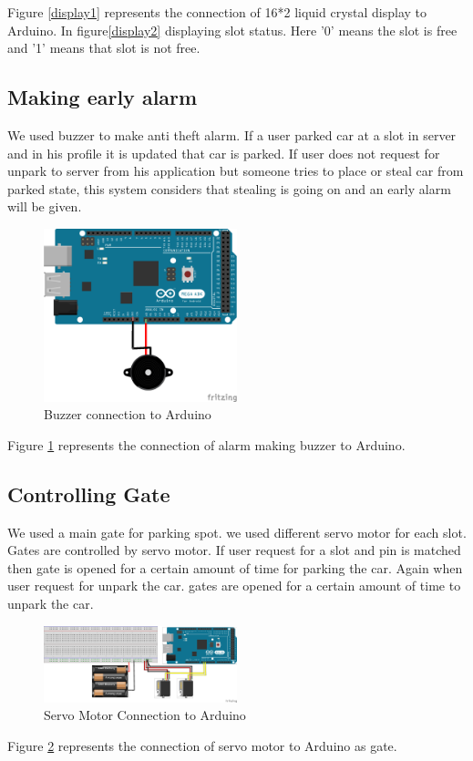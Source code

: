 Figure \ref{display1} represents the connection of 16*2 liquid crystal display to Arduino. In figure\ref{display2} displaying slot status. Here '0' means the slot is free and '1' means that slot is not free.

\subsection{Making early alarm}
We used buzzer to make anti theft alarm. If a user parked car at a slot in server and in his profile it is updated that car is parked. If user does not request for unpark to server from his application but someone tries to place or steal car from parked state, this system considers that stealing is going on and an early alarm will be given. 
\begin{figure}[H]
\centering
\includegraphics[width=0.5\textwidth]{figures/buzzer_bb.png}
\caption{Buzzer connection to Arduino}
\label{display}
\end{figure}
Figure \ref{display} represents the connection of alarm making buzzer to Arduino.

\subsection{Controlling Gate}
We used a main gate for parking spot. we used different servo motor for each slot. Gates are controlled by servo motor. If user request for a slot and pin is matched then gate is opened for a certain amount of time for parking the car. Again when user request for unpark the car. gates are opened for a certain amount of time to unpark the car.
\begin{figure}[H]
\centering
\includegraphics[width=0.5\textwidth]{figures/servo_bb.png}
\caption{Servo Motor Connection to Arduino}
\label{servo}
\end{figure}
Figure \ref{servo} represents the connection of servo motor to Arduino as gate.

